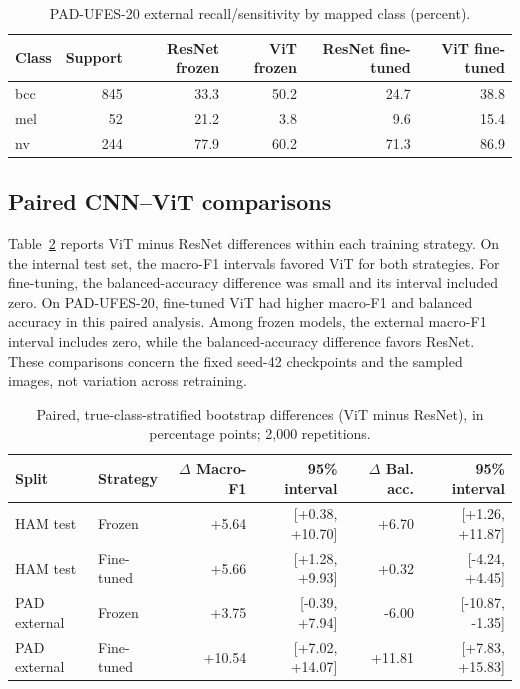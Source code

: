 \documentclass[11pt]{article}
\begin{document}
\begin{table}[H]
\centering
\small
\caption{PAD-UFES-20 external recall/sensitivity by mapped class (percent).}
\label{tab:external-recall}
\begin{tabular}{lrrrrr}
\toprule
Class & Support & ResNet frozen & ViT frozen & ResNet fine-tuned & ViT fine-tuned\\
\midrule
bcc & 845 & 33.3 & 50.2 & 24.7 & 38.8\\
mel & 52  & 21.2 & 3.8  & 9.6  & 15.4\\
nv  & 244 & 77.9 & 60.2 & 71.3 & 86.9\\
\bottomrule
\end{tabular}
\end{table}

\subsection{Paired CNN--ViT comparisons}

Table~\ref{tab:paired} reports ViT minus ResNet differences within each training strategy. On the internal test set, the macro-F1 intervals favored ViT for both strategies. For fine-tuning, the balanced-accuracy difference was small and its interval included zero. On PAD-UFES-20, fine-tuned ViT had higher macro-F1 and balanced accuracy in this paired analysis. Among frozen models, the external macro-F1 interval includes zero, while the balanced-accuracy difference favors ResNet. These comparisons concern the fixed seed-42 checkpoints and the sampled images, not variation across retraining.

\begin{table}[H]
\centering
\small
\caption{Paired, true-class-stratified bootstrap differences (ViT minus ResNet), in percentage points; 2,000 repetitions.}
\label{tab:paired}
\begin{tabular}{llrrrr}
\toprule
Split & Strategy & $\Delta$ Macro-F1 & 95\% interval & $\Delta$ Bal. acc. & 95\% interval\\
\midrule
HAM test & Frozen & +5.64 & [+0.38, +10.70] & +6.70 & [+1.26, +11.87]\\
HAM test & Fine-tuned & +5.66 & [+1.28, +9.93] & +0.32 & [-4.24, +4.45]\\
PAD external & Frozen & +3.75 & [-0.39, +7.94] & -6.00 & [-10.87, -1.35]\\
PAD external & Fine-tuned & +10.54 & [+7.02, +14.07] & +11.81 & [+7.83, +15.83]\\
\bottomrule
\end{tabular}
\end{table}
\end{document}
